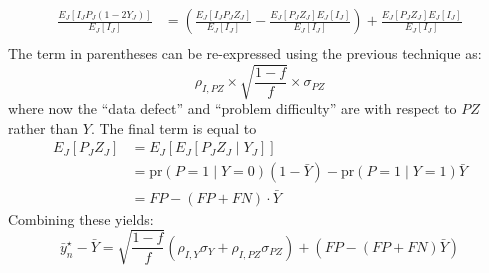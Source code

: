 \documentclass[12pt]{amsart}
\numberwithin{equation}{section}
\theoremstyle{plain}
\def\pr{\text{pr}}
\begin{document}
$$
\begin{aligned}
\frac{E_J \left[ I_J P_J (1-2Y_J) \right]}{E_J [ I_J ] } &= \left( \frac{E_J \left[ I_J P_J Z_J \right]}{E_J [ I_J ] } -  \frac{E_J \left[ P_J Z_J \right] E_J[ I_J]}{E_J [ I_J ] } \right) +  \frac{E_J \left[ P_J Z_J \right] E_J[ I_J]}{E_J [ I_J ] } \\
\end{aligned}
$$
The term in parentheses can be re-expressed using the previous technique as:
$$
\rho_{I, PZ} \times \sqrt{\frac{1-f}{f}} \times \sigma_{PZ}
$$
where now the ``data defect'' and ``problem difficulty'' are with respect to $PZ$ rather than $Y$. The final term is equal to
$$
\begin{aligned}
E_J [P_J Z_J ] &= E_J [ E_J [ P_J Z_J \mid Y_J ] ] \\
&= \pr (P = 1 \mid Y = 0) (1-\bar Y) - \pr(P=1 \mid Y = 1) \bar Y \\
&= FP - (FP + FN) \cdot \bar Y
\end{aligned}
$$
Combining these yields:
$$
\bar y_n^\star - \bar Y = \sqrt{\frac{1-f}{f}} \left(\rho_{I,Y} \sigma_Y + \rho_{I, PZ} \sigma_{PZ} \right) + \left( FP - (FP+FN) \bar Y \right)
$$
\end{document}
